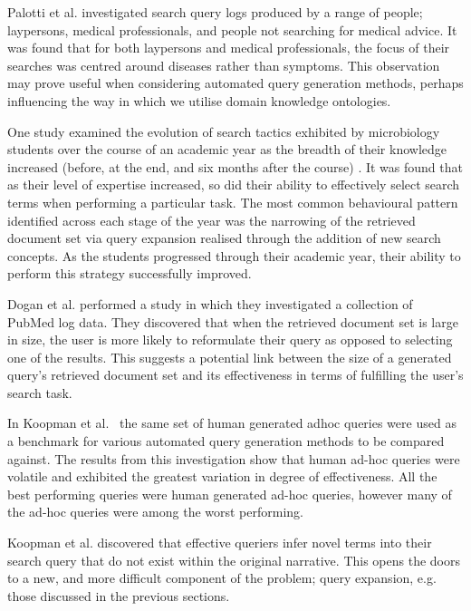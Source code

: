 \documentclass[a4paper]{report}
\begin{document}
Palotti et al. \cite{Palotti2016} investigated search query logs produced by a range of people; laypersons, medical professionals, and people not searching for medical advice. It was found that for both laypersons and medical professionals, the focus of their searches was centred around diseases rather than symptoms. This observation may prove useful when considering automated query generation methods, perhaps influencing the way in which we utilise domain knowledge ontologies.

One study examined the evolution of search tactics exhibited by microbiology students over the course of an academic year as the breadth of their knowledge increased (before, at the end, and six months after the course) \cite{ASI:ASI10367}. It was found that as their level of expertise increased, so did their ability to effectively select search terms when performing a particular task. The most common behavioural pattern identified across each stage of the year was the narrowing of the retrieved document set via query expansion realised through the addition of new search concepts. As the students progressed through their academic year, their ability to perform this strategy successfully improved. 

Dogan et al. \cite{doi:10.1093/database/bap018} performed a study in which they investigated a collection of PubMed log data. They discovered that when the retrieved document set is large in size, the user is more likely to reformulate their query as opposed to selecting one of the results. This suggests a potential link between the size of a generated query's retrieved document set and its effectiveness in terms of fulfilling the user's search task.

In Koopman et al.~\citep{koopman2017generating} the same set of human generated adhoc queries were used as a benchmark for various automated query generation methods to be compared against. The results from this investigation show that human ad-hoc queries were volatile and exhibited the greatest variation in degree of effectiveness. All the best performing queries were human generated ad-hoc queries, however many of the ad-hoc queries were among the worst performing.

Koopman et al. \cite{Koopman2017What-makes-an-E} discovered that effective queriers infer novel terms into their search query that do not exist within the original narrative. This opens the doors to a new, and more difficult component of the problem; query expansion, e.g. those discussed in the previous sections. 
\end{document}
